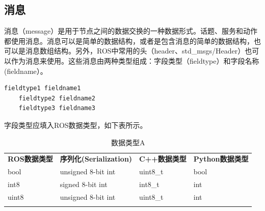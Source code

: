 \documentclass[geye,green,kindle,cn]{elegantnote}
\begin{document}
\subsection{消息}
消息（message）是用于节点之间的数据交换的一种数据形式。话题、服务和动作都使用消息。消息可以是简单的数据结构，或者是包含消息的简单的数据结构，也可以是消息数组结构。另外，ROS中常用的头（header、std\_msgs/Header）也可以作为消息来使用。这些消息由两种类型组成：字段类型（fieldtype）和字段名称(fieldname）。
\begin{lstlisting}[frame=single,language=bash]
    fieldtype1 fieldname1
    fieldtype2 fieldname2
    fieldtype3 fieldname3
\end{lstlisting}

字段类型应填入ROS数据类型，如下表所示。
\begin{table}[htbp]
\centering
\begin{tabular}{p{35pt}<{\centering}|p{55pt}<{\centering}|p{40pt}<{\centering}|p{40pt}<{\centering}} 
\Xhline{1.0pt}
\textbf{\small{ROS数据类型}} &
\textbf{\small{序列化(Serialization)}} &
\textbf{\small{C++数据类型}} &
\textbf{\small{Python数据类型}} \\
\Xhline{1.0pt}
\scriptsize{bool} &
\scriptsize{unsigned 8-bit int} &
\scriptsize{uint8\_t} &
\scriptsize{bool} \\
\hline
\scriptsize{int8} &
\scriptsize{signed 8-bit int} &
\scriptsize{int8\_t} &
\scriptsize{int} \\
\hline
\scriptsize{uint8} &
\scriptsize{unsigned 8-bit int} &
\scriptsize{uint8\_t} &
\scriptsize{int} \\
\Xhline{1.0pt}
\end{tabular}
\centering
\caption{数据类型A} \label{table:DatatypeA}
\end{table}
\end{document}
